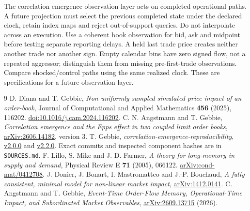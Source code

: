 \documentclass[11pt,a4paper]{article}
\begin{document}
The correlation-emergence observation layer acts on completed operational
paths. A future projection must select the previous completed state under
the declared clock, retain index maps and reject out-of-support queries.
Do not interpolate across an execution. Use a coherent book observation for
bid, ask and midpoint before testing separate reporting delays. A held last
trade price creates neither another trade nor another sign. Empty calendar
bins have zero signed flow, not a repeated aggressor; distinguish them from
missing pre-first-trade observations. Compare shocked/control paths using
the same realized clock. These are specifications for a future observation layer.

\clearpage
\begin{thebibliography}{9}\small
{} D. Diana and T. Gebbie, \emph{Non-uniformly sampled simulated
price impact of an order-book}, Journal of Computational and Applied
Mathematics \textbf{456} (2025), 116202.
\href{https://doi.org/10.1016/j.cam.2024.116202}{doi:10.1016/j.cam.2024.116202}.
 C. N. Angstmann and T. Gebbie, \emph{Correlation emergence and
the Epps effect in two coupled limit order books},
\href{https://arxiv.org/abs/2606.14182}{arXiv:2606.14182}, version 3.
 T. Gebbie, \emph{correlation-emergence-reproducibility},
\href{https://github.com/timgebbie/correlation-emergence-reproducibility/releases/tag/v2.0.0}{v2.0.0}
and \href{https://github.com/timgebbie/correlation-emergence-reproducibility/releases/tag/v2.2.0}{v2.2.0}.
Exact commits and inspected component hashes are in \texttt{SOURCES.md}.
 F. Lillo, S. Mike and J. D. Farmer, \emph{A theory for
long-memory in supply and demand}, Physical Review E \textbf{71} (2005),
066122. \href{https://arxiv.org/abs/cond-mat/0412708}{arXiv:cond-mat/0412708}.
 J. Donier, J. Bonart, I. Mastromatteo and J.-P. Bouchaud,
\emph{A fully consistent, minimal model for non-linear market impact},
\href{https://arxiv.org/abs/1412.0141}{arXiv:1412.0141}.
 C. Angstmann and T. Gebbie, \emph{Event-Time Order-Flow
Memory, Operational-Time Impact, and Subordinated Market Observables},
\href{https://arxiv.org/abs/2609.13715}{arXiv:2609.13715} (2026).
\end{thebibliography}
\end{document}
